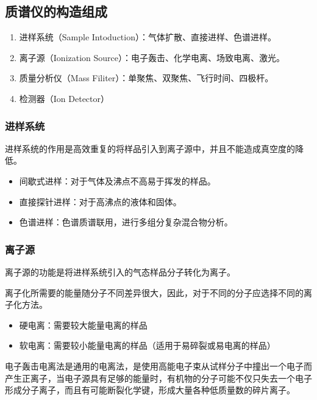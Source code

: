 \subsection{质谱仪的构造组成}
\begin{enumerate}
    \item 进样系统（Sample Intoduction）：气体扩散、直接进样、色谱进样。
    \item 离子源（Ionization Source）：电子轰击、化学电离、场致电离、激光。
    \item 质量分析仪（Mass Filiter）：单聚焦、双聚焦、飞行时间、四极杆。
    \item 检测器（Ion Detector）
\end{enumerate}

\subsubsection{进样系统}
进样系统的作用是高效重复的将样品引入到离子源中，并且不能造成真空度的降低。
\begin{itemize}
    \item 间歇式进样：对于气体及沸点不高易于挥发的样品。
    \item 直接探针进样：对于高沸点的液体和固体。
    \item 色谱进样：色谱质谱联用，进行多组分复杂混合物分析。
\end{itemize}

\subsubsection{离子源}

离子源的功能是将进样系统引入的气态样品分子转化为离子。

离子化所需要的能量随分子不同差异很大，因此，对于不同的分子应选择不同的离子化方法。
\begin{itemize}
    \item 硬电离：需要较大能量电离的样品
    \item 软电离：需要较小能量电离的样品（适用于易碎裂或易电离的样品）
\end{itemize}

电子轰击电离法是通用的电离法，是使用高能电子束从试样分子中撞出一个电子而产生正离子，当电子源具有足够的能量时，有机物的分子可能不仅只失去一个电子形成分子离子，而且有可能断裂化学键，形成大量各种低质量数的碎片离子。

